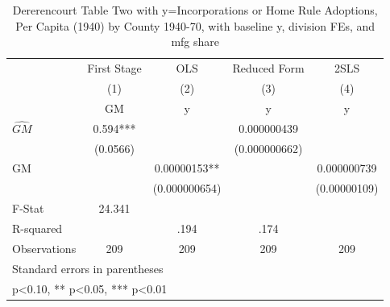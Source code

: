 \begin{table}[htbp]\centering
\def\sym#1{\ifmmode^{#1}\else\(^{#1}\)\fi}
\caption{Dererencourt Table Two with y=Incorporations or Home Rule Adoptions, Per Capita (1940) by County 1940-70, with baseline y, division FEs, and mfg share}
\begin{tabular}{l*{4}{c}}
\toprule
                    & First Stage   &         OLS   &Reduced Form   &        2SLS   \\
                    &\multicolumn{1}{c}{(1)}&\multicolumn{1}{c}{(2)}&\multicolumn{1}{c}{(3)}&\multicolumn{1}{c}{(4)}\\
                    &\multicolumn{1}{c}{GM}&\multicolumn{1}{c}{y}&\multicolumn{1}{c}{y}&\multicolumn{1}{c}{y}\\
\midrule
$\hat{GM}$          &       0.594***&               & 0.000000439   &               \\
                    &    (0.0566)   &               &(0.000000662)   &               \\
\addlinespace
GM                  &               &  0.00000153** &               & 0.000000739   \\
                    &               &(0.000000654)   &               &(0.00000109)   \\
\midrule
F-Stat              &      24.341   &               &               &               \\
R-squared           &               &        .194   &        .174   &               \\
Observations        &         209   &         209   &         209   &         209   \\
\bottomrule
\multicolumn{5}{l}{\footnotesize Standard errors in parentheses}\\
\multicolumn{5}{l}{\footnotesize * p<0.10, ** p<0.05, *** p<0.01}\\
\end{tabular}
\end{table}
